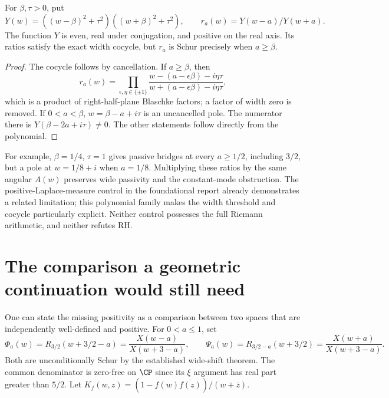 \begin{proposition}
For $\beta,\tau>0$, put
\[
 Y(w)=((w-\beta)^2+\tau^2)((w+\beta)^2+\tau^2),\qquad
 r_a(w)=Y(w-a)/Y(w+a).
\]
The function $Y$ is even, real under conjugation, and positive on the real axis. Its ratios satisfy the exact width cocycle, but $r_a$ is Schur precisely when $a\geq\beta$.
\end{proposition}
\begin{proof}
The cocycle follows by cancellation. If $a\geq\beta$, then
\[
 r_a(w)=\prod_{\epsilon,\eta\in\{\pm1\}}
 \frac{w-(a-\epsilon\beta)-i\eta\tau}
      {w+(a-\epsilon\beta)-i\eta\tau},
\]
which is a product of right-half-plane Blaschke factors; a factor of width zero is removed. If $0<a<\beta$, $w=\beta-a+i\tau$ is an uncancelled pole. The numerator there is $Y(\beta-2a+i\tau)\ne0$. The other statements follow directly from the polynomial.
\end{proof}
For example, $\beta=1/4$, $\tau=1$ gives passive bridges at every $a\geq1/2$, including $3/2$, but a pole at $w=1/8+i$ when $a=1/8$. Multiplying these ratios by the same angular $A(w)$ preserves wide passivity and the constant-mode obstruction. The positive-Laplace-measure control in the foundational report already demonstrates a related limitation; this polynomial family makes the width threshold and cocycle particularly explicit. Neither control possesses the full Riemann arithmetic, and neither refutes RH.

\section{The comparison a geometric continuation would still need}
One can state the missing positivity as a comparison between two spaces that are independently well-defined and positive. For $0<a\leq1$, set
\[
 \Phi_a(w)=R_{3/2}(w+3/2-a)=\frac{X(w-a)}{X(w+3-a)},\qquad
 \Psi_a(w)=R_{3/2-a}(w+3/2)=\frac{X(w+a)}{X(w+3-a)}.
\]
Both are unconditionally Schur by the established wide-shift theorem. The common denominator is zero-free on $\CP$ since its $\xi$ argument has real part greater than $5/2$. Let
$K_f(w,z)=(1-f(w)\overline{f(z)})/(w+\bar z)$.

